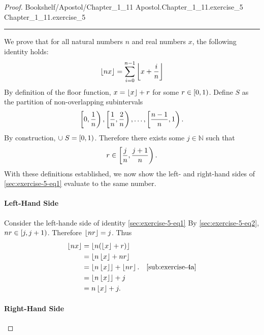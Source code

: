 \documentclass{article}
\newcommand{\link}[1]{\lean{../..}
  {Bookshelf/Apostol/Chapter\_1\_11}
  {Apostol.Chapter\_1\_11.#1}
  {Chapter\_1\_11.#1}
}
\begin{document}
\begin{proof}

  \link{exercise\_5}

  \vspace{10pt}
  \hrule
  \vspace{10pt}

  We prove that for all natural numbers $n$ and real numbers $x$, the following
    identity holds:
    \begin{equation}
      \label{sec:exercise-5-eq1}
      \left\lfloor nx\right\rfloor = \sum_{i=0}^{n-1} \left\lfloor x + \frac{i}{n}\right\rfloor
    \end{equation}
  By definition of the floor function, $x = \left\lfloor x\right\rfloor + r$ for some
    $r \in \left[0, 1\right)$.
  Define $S$ as the partition of non-overlapping subintervals
    $$\left[0, \frac{1}{n}\right), \left[\frac{1}{n}, \frac{2}{n}\right), \ldots,
      \left[\frac{n-1}{n}, 1\right).$$
  By construction, $\cup\; S = \left[0, 1\right)$.
  Therefore there exists some $j \in \mathbb{N}$ such that
    \begin{equation}
      \label{sec:exercise-5-eq2}
      r \in \left[\frac{j}{n}, \frac{j+1}{n}\right).
    \end{equation}
  With these definitions established, we now show the left- and right-hand sides
    of \eqref{sec:exercise-5-eq1} evaluate to the same number.

  \paragraph{Left-Hand Side}%

    Consider the left-hande side of identity \eqref{sec:exercise-5-eq1}
    By \eqref{sec:exercise-5-eq2}, $nr \in \left[j, j + 1\right)$.
    Therefore $\left\lfloor nr\right\rfloor = j$.
    Thus
      \begin{align}
        \left\lfloor nx\right\rfloor
          & = \left\lfloor n(\left\lfloor x\right\rfloor + r)\right\rfloor \nonumber \\
          & = \left\lfloor n\left\lfloor x\right\rfloor + nr\right\rfloor \nonumber \\
          & = \left\lfloor n\left\lfloor x\right\rfloor\right\rfloor + \left\lfloor nr\right\rfloor. \nonumber
            & \eqref{sub:exercise-4a} \\
          & = \left\lfloor n\left\lfloor x\right\rfloor\right\rfloor + j \nonumber \\
          & = n\left\lfloor x\right\rfloor + j. \label{sec:exercise-5-eq3}
      \end{align}

  \paragraph{Right-Hand Side}%


\end{proof}
\end{document}
